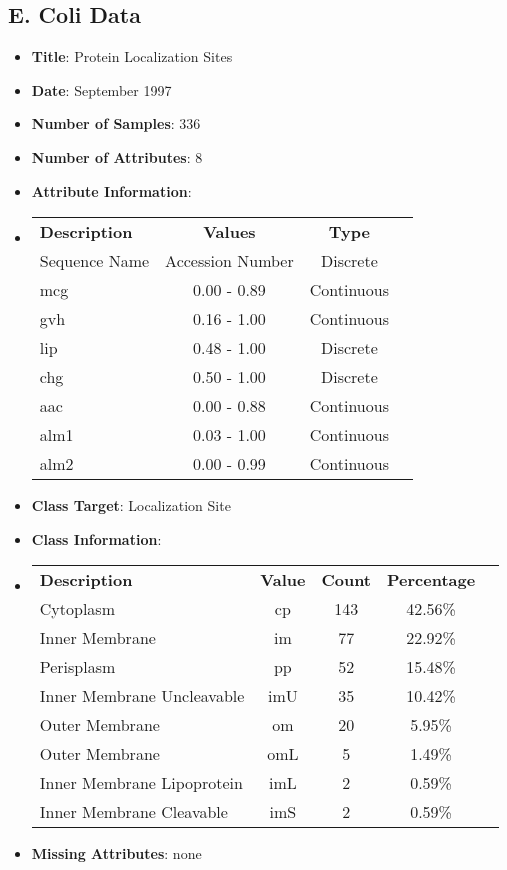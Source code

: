 \documentclass[11pt]{article}
\newcommand{\bb}{\textbf}
\begin{document}
\subsection{E. Coli Data}
\begin{itemize}[leftmargin=*]
  \item[] \bb{Title}: Protein Localization Sites
  \item[] \bb{Date}: September 1997
  \item[] \bb{Number of Samples}: 336
  \item[] \bb{Number of Attributes}: 8
  \item[] \bb{Attribute Information}:
  \item[]
  \begin{tabular}{l c c c }
    \bb{Description} & \bb{Values}       & \bb{Type}  \\
    Sequence Name    &  Accession Number & Discrete   \\
    mcg              & 0.00 - 0.89       & Continuous \\
    gvh              & 0.16 - 1.00       & Continuous \\
    lip              & 0.48 - 1.00       & Discrete   \\
    chg              & 0.50 - 1.00       & Discrete   \\
    aac              & 0.00 - 0.88       & Continuous \\
    alm1             & 0.03 - 1.00       & Continuous \\
    alm2             & 0.00 - 0.99       & Continuous
  \end{tabular}
  \item[] \bb{Class Target}:  Localization Site
  \item[] \bb{Class Information}:
  \item[]
  \begin{tabular}{l c c c c }
    \bb{Description}           & \bb{Value} & \bb{Count} & \bb{Percentage} \\
    Cytoplasm                  & cp         & 143        & 42.56\%         \\
    Inner Membrane             & im         & 77         & 22.92\%         \\
    Perisplasm                 & pp         & 52         & 15.48\%         \\
    Inner Membrane Uncleavable & imU        & 35         & 10.42\%         \\
    Outer Membrane             & om         & 20         & 5.95\%          \\
    Outer Membrane             & omL        & 5          & 1.49\%          \\
    Inner Membrane Lipoprotein & imL        & 2          & 0.59\%          \\
    Inner Membrane Cleavable   & imS        & 2          & 0.59\%
  \end{tabular}
  \item[] \bb{Missing Attributes}: none
\end{itemize}
\end{document}
